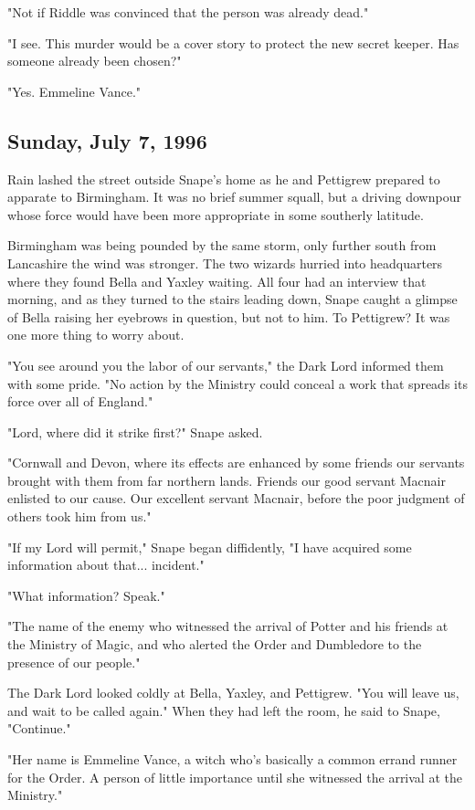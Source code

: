 \documentclass[a4paper,11pt]{article}
\begin{document}
"Not if Riddle was convinced that the person was already dead."

"I see. This murder would be a cover story to protect the new secret keeper. Has someone already been chosen?"

"Yes. Emmeline Vance."

\subsection{Sunday, July 7, 1996}

Rain lashed the street outside Snape's home as he and Pettigrew prepared to apparate to Birmingham. It was no brief summer squall, but a driving downpour whose force would have been more appropriate in some southerly latitude.

Birmingham was being pounded by the same storm, only further south from Lancashire the wind was stronger. The two wizards hurried into headquarters where they found Bella and Yaxley waiting. All four had an interview that morning, and as they turned to the stairs leading down, Snape caught a glimpse of Bella raising her eyebrows in question, but not to him. To Pettigrew? It was one more thing to worry about.

"You see around you the labor of our servants," the Dark Lord informed them with some pride. "No action by the Ministry could conceal a work that spreads its force over all of England."

"Lord, where did it strike first?" Snape asked.

"Cornwall and Devon, where its effects are enhanced by some friends our servants brought with them from far northern lands. Friends our good servant Macnair enlisted to our cause. Our excellent servant Macnair, before the poor judgment of others took him from us."

"If my Lord will permit," Snape began diffidently, "I have acquired some information about that... incident."

"What information? Speak."

"The name of the enemy who witnessed the arrival of Potter and his friends at the Ministry of Magic, and who alerted the Order and Dumbledore to the presence of our people."

The Dark Lord looked coldly at Bella, Yaxley, and Pettigrew. "You will leave us, and wait to be called again." When they had left the room, he said to Snape, "Continue."

"Her name is Emmeline Vance, a witch who's basically a common errand runner for the Order. A person of little importance until she witnessed the arrival at the Ministry."
\end{document}
